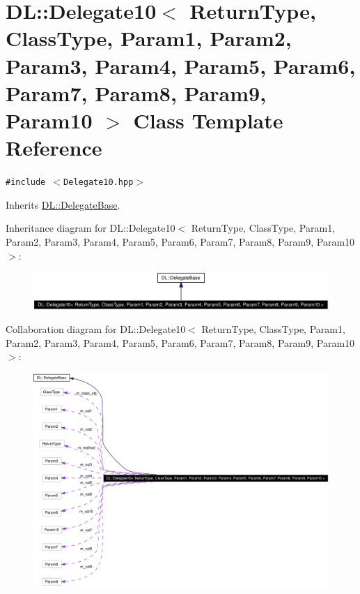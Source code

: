 \hypertarget{classDL_1_1Delegate10}{
\section{DL::Delegate10$<$ Return\-Type, Class\-Type, Param1, Param2, Param3, Param4, Param5, Param6, Param7, Param8, Param9, Param10 $>$ Class Template Reference}
\label{classDL_1_1Delegate10}
}
{\tt \#include $<$Delegate10.hpp$>$}

Inherits \hyperlink{classDL_1_1DelegateBase}{DL::Delegate\-Base}.

Inheritance diagram for DL::Delegate10$<$ Return\-Type, Class\-Type, Param1, Param2, Param3, Param4, Param5, Param6, Param7, Param8, Param9, Param10 $>$:\begin{figure}[H]
\begin{center}
\leavevmode
\includegraphics[width=325pt]{classDL_1_1Delegate10__inherit__graph}
\end{center}
\end{figure}
Collaboration diagram for DL::Delegate10$<$ Return\-Type, Class\-Type, Param1, Param2, Param3, Param4, Param5, Param6, Param7, Param8, Param9, Param10 $>$:\begin{figure}[H]
\begin{center}
\leavevmode
\includegraphics[width=420pt]{classDL_1_1Delegate10__coll__graph}
\end{center}
\end{figure}
